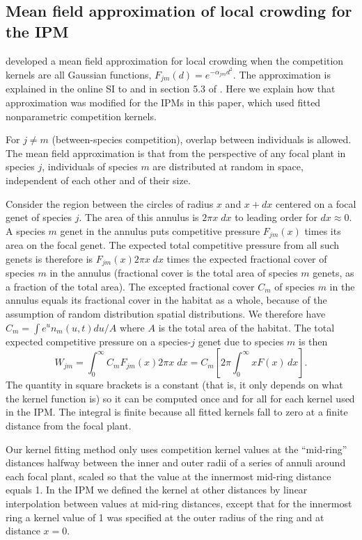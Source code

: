 \documentclass[11pt]{article}
\begin{document}
\subsection{Mean field approximation of local crowding for the IPM} 
\citet{adler-etal-2010} developed a mean field approximation for local crowding when the
competition kernels are all Gaussian functions, $F_{jm}(d) = e^{-\alpha_{jm} d^2}$. The approximation is explained in 
the online SI to \citet{adler-etal-2010} and in section 5.3 of \citet{ipmbook-2016}. 
Here we explain how that approximation was modified for the IPMs in this paper, which
used fitted nonparametric competition kernels. 

For $j \ne m$ (between-species competition), overlap between individuals is allowed. The mean field approximation is 
that from the perspective of any focal plant in species $j$, individuals of species $m$ are distributed at random in space, 
independent of each other and of their size.

Consider the region between the circles of radius $x$ and $x+dx$ centered on a focal genet of species $j$. The area of this annulus
is $2 \pi x \; dx$  to leading order for $dx \approx 0$. A species $m$ genet 
in the annulus puts competitive pressure $F_{jm}(x)$ times its area on
the focal genet. The expected total competitive pressure from all such genets 
is therefore is $F_{jm}(x) 2 \pi x \; dx$ times the expected fractional cover of species $m$ in the annulus 
(fractional cover is the total area of species $m$ genets, as a fraction of the total area). The excepted fractional cover $C_m$ of species $m$
in the annulus equals its fractional cover in the habitat as a whole, because of the assumption of random distribution
spatial distributions. We therefore have $C_m  = \int e^u n_m(u,t) du/A$ where $A$ is the total area of the habitat. 
The total expected competitive pressure on a species-$j$ genet due to species $m$ is then 
\begin{equation}
W_{jm} = \int_0^\infty{C_m F_{jm}(x) 2 \pi x \; dx}  = C_m \left [2 \pi \int_0^{\infty} x F(x) \, dx \right ].
\label{eqn:wbarm}
\end{equation} 
The quantity in square brackets is a constant (that is, it only depends on what the kernel function
is) so it can be computed once and for all for each kernel used in the IPM. The integral is finite because
all fitted kernels fall to zero at a finite distance from the focal plant. 

Our kernel fitting method only uses competition kernel values at the ``mid-ring'' distances
halfway between the inner and outer radii of a series of annuli around each focal
plant, scaled so that the value at the innermost mid-ring distance equals 1. 
In the IPM we defined the kernel at other distances by linear interpolation between values at 
mid-ring distances, except that for the innermost ring a kernel value of 1 was specified at the
outer radius of the ring and at distance $x=0$. 
\end{document}
